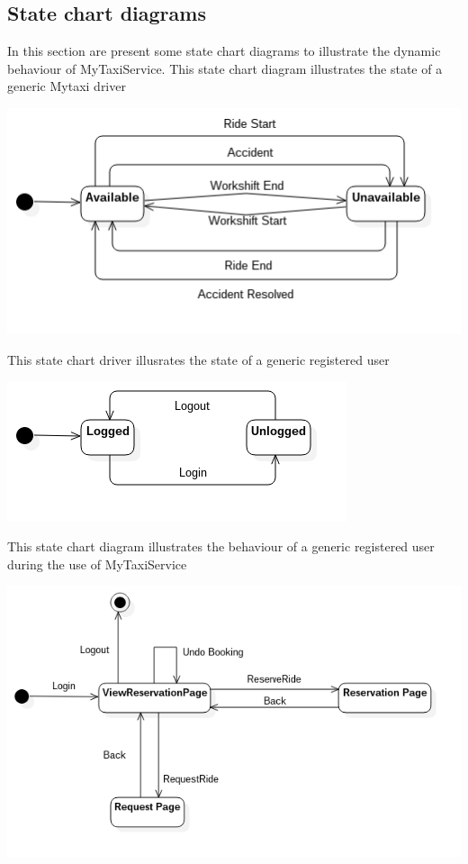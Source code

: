 \documentclass[11pt,titlepage]{article} %
\begin{document}
	\subsection{State chart diagrams}
	In this section are present some state chart diagrams to illustrate the dynamic behaviour of MyTaxiService.\newline
	\newline 
	This state chart diagram illustrates the state of a generic Mytaxi driver
	\begin{center}
	\includegraphics[scale=0.52]{statechartdriver.png}
	\end{center}
	This state chart driver illusrates the state of a generic registered user\newline
	\newline
	\begin{center}
	\includegraphics[scale=0.52]{statechartuser.png}
	\end{center}
	\newpage
	This state chart diagram illustrates the behaviour of a generic registered user during the use of MyTaxiService\newline
	\newline
	\begin{center}
	\includegraphics[scale=0.52]{statechartgeneral.png}
	\end{center} 
	\newpage
\end{document}
